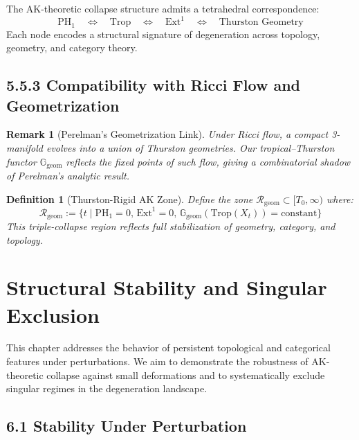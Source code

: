 \documentclass[11pt]{article}
\newtheorem{definition}[theorem]{Definition}
\newtheorem{remark}[theorem]{Remark}
\begin{document}
\begin{corollary}
The AK-theoretic collapse structure admits a tetrahedral correspondence:
\[
\mathrm{PH}_1 \quad \Longleftrightarrow \quad \mathrm{Trop} \quad \Longleftrightarrow \quad \mathrm{Ext}^1 \quad \Longleftrightarrow \quad \text{Thurston Geometry}
\]
Each node encodes a structural signature of degeneration across topology, geometry, and category theory.
\end{corollary}

\subsection{5.5.3 Compatibility with Ricci Flow and Geometrization}

\begin{remark}[Perelman's Geometrization Link]
Under Ricci flow, a compact 3-manifold evolves into a union of Thurston geometries. Our tropical–Thurston functor \( \mathbb{G}_\mathrm{geom} \) reflects the fixed points of such flow, giving a combinatorial shadow of Perelman's analytic result.
\end{remark}

\begin{definition}[Thurston-Rigid AK Zone]
Define the zone \( \mathcal{R}_\mathrm{geom} \subset [T_0, \infty) \) where:
\[
\mathcal{R}_\mathrm{geom} := \{ t \mid \mathrm{PH}_1 = 0,\, \mathrm{Ext}^1 = 0,\, \mathbb{G}_\mathrm{geom}(\mathrm{Trop}(X_t)) = \text{constant} \}
\]
This triple-collapse region reflects full stabilization of geometry, category, and topology.
\end{definition}


\section{Structural Stability and Singular Exclusion}

This chapter addresses the behavior of persistent topological and categorical features under perturbations. We aim to demonstrate the robustness of AK-theoretic collapse against small deformations and to systematically exclude singular regimes in the degeneration landscape.

\subsection{6.1 Stability Under Perturbation}
\end{document}
